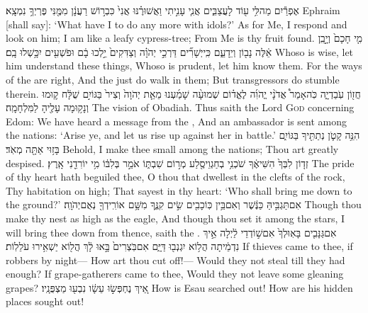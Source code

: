 {אֶפְרַ֕יִם מַה\maqqaf לִּ֥י ע֖וֹד לָעֲצַבִּ֑ים אֲנִ֧י עָנִ֣יתִי וַאֲשׁוּרֶ֗נּוּ אֲנִי֙ כִּבְר֣וֹשׁ רַעֲנָ֔ן מִמֶּ֖נִּי פֶּרְיְךָ֥ נִמְצָֽא׃}
{Ephraim [shall say]: ‘What have I to do any more with idols?’ As for Me, I respond and look on him; I am like a leafy cypress-tree; From Me is thy fruit found.}
{מִ֤י חָכָם֙ וְיָ֣בֵֽן אֵ֔לֶּה נָב֖וֹן וְיֵדָעֵ֑ם כִּֽי\maqqaf יְשָׁרִ֞ים דַּרְכֵ֣י יְהֹוָ֗ה וְצַדִּקִים֙ יֵ֣לְכוּ בָ֔ם וּפֹשְׁעִ֖ים יִכָּ֥שְׁלוּ בָֽם׃}
{Whoso is wise, let him understand these things, Whoso is prudent, let him know them. For the ways of the \lord\space are right, And the just do walk in them; But transgressors do stumble therein.}
\newperek
{}
\label{haft_8}
\setcounter{chap}{1}
\setcounter{verse}{1}
{חֲז֖וֹן עֹֽבַדְיָ֑ה כֹּֽה\maqqaf אָמַר֩ אֲדֹנָ֨י יֱהֹוִ֜ה לֶאֱד֗וֹם שְׁמוּעָ֨ה שָׁמַ֜עְנוּ מֵאֵ֤ת יְהֹוָה֙ וְצִיר֙ בַּגּוֹיִ֣ם שֻׁלָּ֔ח ק֛וּמוּ וְנָק֥וּמָה עָלֶ֖יהָ לַמִּלְחָמָֽה׃}
{The vision of Obadiah. Thus saith the Lord \textsc{God} concerning Edom: We have heard a message from the \lord, And an ambassador is sent among the nations: ‘Arise ye, and let us rise up against her in battle.’}
{הִנֵּ֥ה קָטֹ֛ן נְתַתִּ֖יךָ בַּגּוֹיִ֑ם בָּז֥וּי אַתָּ֖ה מְאֹֽד׃}
{Behold, I make thee small among the nations; Thou art greatly despised.}
{זְד֤וֹן לִבְּךָ֙ הִשִּׁיאֶ֔ךָ שֹׁכְנִ֥י בְחַגְוֵי\maqqaf סֶ֖לַע מְר֣וֹם שִׁבְתּ֑וֹ אֹמֵ֣ר בְּלִבּ֔וֹ מִ֥י יוֹרִדֵ֖נִי אָֽרֶץ׃}
{The pride of thy heart hath beguiled thee, O thou that dwellest in the clefts of the rock, Thy habitation on high; That sayest in thy heart: ‘Who shall bring me down to the ground?’}
{אִם\maqqaf תַּגְבִּ֣יהַּ כַּנֶּ֔שֶׁר וְאִם\maqqaf בֵּ֥ין כּֽוֹכָבִ֖ים שִׂ֣ים קִנֶּ֑ךָ מִשָּׁ֥ם אוֹרִֽידְךָ֖ נְאֻם\maqqaf יְהֹוָֽה׃}
{Though thou make thy nest as high as the eagle, And though thou set it among the stars, I will bring thee down from thence, saith the \lord.}
{אִם\maqqaf גַּנָּבִ֤ים בָּאֽוּ\maqqaf לְךָ֙ אִם\maqqaf שׁ֣וֹדְדֵי לַ֔יְלָה אֵ֣יךְ נִדְמֵ֔יתָה הֲל֥וֹא יִגְנְב֖וּ דַּיָּ֑ם אִם\maqqaf בֹּֽצְרִים֙ בָּ֣אוּ לָ֔ךְ הֲל֖וֹא יַשְׁאִ֥ירוּ עֹלֵלֽוֹת׃}
{If thieves came to thee, if robbers by night— How art thou cut off!— Would they not steal till they had enough? If grape-gatherers came to thee, Would they not leave some gleaning grapes?}
{אֵ֚יךְ נֶחְפְּשׂ֣וּ עֵשָׂ֔ו נִבְע֖וּ מַצְפֻּנָֽיו׃}
{How is Esau searched out! How are his hidden places sought out!}
